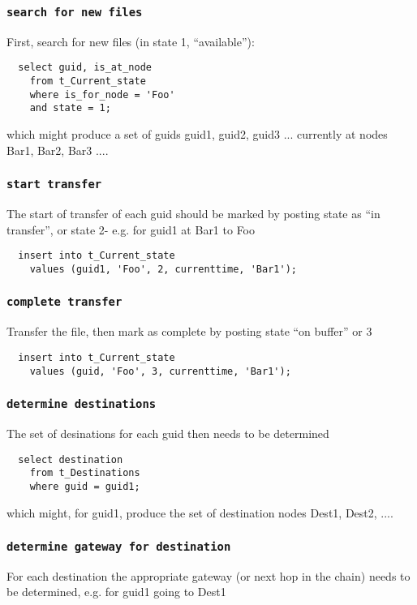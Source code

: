 \documentclass{cmspaper}
\begin{document}
\subsubsection{\textbf{\texttt{search for new files}}}
First, search for new files (in state 1, ``available''):

{\small\begin{verbatim}
  select guid, is_at_node
    from t_Current_state
    where is_for_node = 'Foo'
    and state = 1;
\end{verbatim}}

which might produce a set of guids {guid1, guid2, guid3 ...} currently at nodes {Bar1, Bar2, Bar3 ...}. 

\subsubsection{\textbf{\texttt{start transfer}}}
The start of transfer of each guid should be marked by posting state as ``in transfer'', or state 2- e.g. for guid1 at Bar1 to Foo

{\small\begin{verbatim}
  insert into t_Current_state
    values (guid1, 'Foo', 2, currenttime, 'Bar1');
\end{verbatim}}

\subsubsection{\textbf{\texttt{complete transfer}}}
Transfer the file, then mark as complete by posting state ``on buffer'' or 3

{\small\begin{verbatim}
  insert into t_Current_state
    values (guid, 'Foo', 3, currenttime, 'Bar1');
\end{verbatim}}

\subsubsection{\textbf{\texttt{determine destinations}}}
The set of desinations for each guid then needs to be determined

{\small\begin{verbatim}
  select destination
    from t_Destinations
    where guid = guid1;
\end{verbatim}}

which might, for guid1, produce the set of destination nodes {Dest1, Dest2, ...}. 

\subsubsection{\textbf{\texttt{determine gateway for destination}}}
For each destination the appropriate gateway (or next hop in the chain) needs to be determined, e.g. for guid1 going to Dest1
\end{document}
